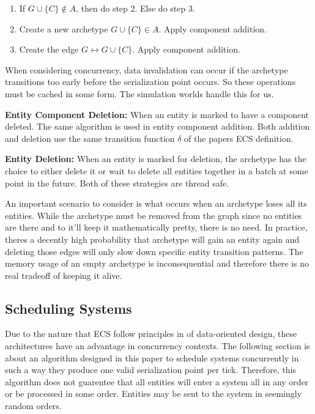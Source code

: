 \begin{enumerate}
    \item If $G \cup \{C\} \not\in A$, then do step 2. Else do step 3.
    \item Create a new archetype $G \cup \{C\} \in A$. Apply component addition.
    \item Create the edge $G \leftrightarrow G \cup \{C\}$. Apply component addition.
\end{enumerate}

When considering concurrency, data invalidation can occur if the archetype transitions too early before the serialization point occurs. So these operations must be cached in some form. The simulation worlds handle this for us.

\textbf{Entity Component Deletion: } When an entity is marked to have a component deleted. The same algorithm is used in entity component addition. Both addition and deletion use the same transition function $\delta$ of the papers ECS definition.  

\textbf{Entity Deletion: }
When an entity is marked for deletion, the archetype has the choice to either delete it or wait to delete all entities together in a batch at some point in the future. Both of these strategies are thread safe. 

An important scenario to consider is what occurs when an archetype loses all its entities. While the archetype must be removed from the graph since no entities are there and to it'll keep it mathematically pretty, there is no need. In practice, theres a decently high probability that archetype will gain an entity again and deleting those edges will only slow down specific entity transition patterns. The memory usage of an empty archetype is inconsequential and therefore there is no real tradeoff of keeping it alive.

\subsection{Scheduling Systems}
\label{sec:scheduling}

Due to the nature that ECS follow principles in of data-oriented design, these architectures have an advantage in concurrency contexts. The following section is about an algorithm designed in this paper to schedule systems concurrently in such a way they produce one valid serialization point per tick. Therefore, this algorithm does not guarentee that all entities will enter a system all in any order or be processed in some order. Entities may be sent to the system in seemingly random orders.


